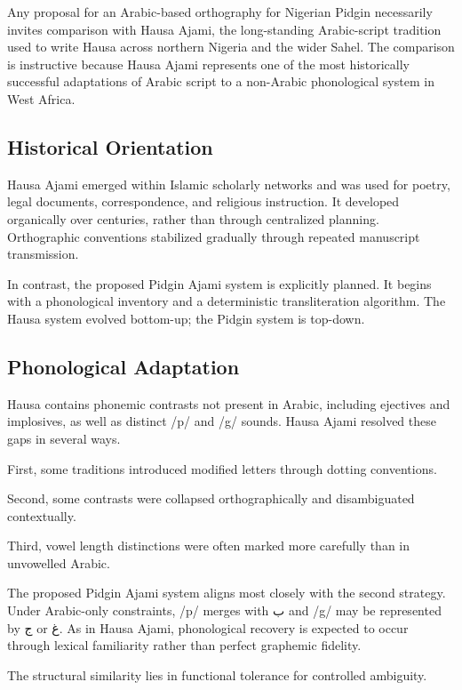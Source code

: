 \documentclass[12pt]{article}
\newcommand{\AR}[1]{\foreignlanguage{arabic}{#1}}
\begin{document}
Any proposal for an Arabic-based orthography for Nigerian Pidgin necessarily invites comparison with Hausa Ajami, the long-standing Arabic-script tradition used to write Hausa across northern Nigeria and the wider Sahel. The comparison is instructive because Hausa Ajami represents one of the most historically successful adaptations of Arabic script to a non-Arabic phonological system in West Africa.

\subsection{Historical Orientation}

Hausa Ajami emerged within Islamic scholarly networks and was used for poetry, legal documents, correspondence, and religious instruction. It developed organically over centuries, rather than through centralized planning. Orthographic conventions stabilized gradually through repeated manuscript transmission.

In contrast, the proposed Pidgin Ajami system is explicitly planned. It begins with a phonological inventory and a deterministic transliteration algorithm. The Hausa system evolved bottom-up; the Pidgin system is top-down.

\subsection{Phonological Adaptation}

Hausa contains phonemic contrasts not present in Arabic, including ejectives and implosives, as well as distinct /p/ and /g/ sounds. Hausa Ajami resolved these gaps in several ways.

First, some traditions introduced modified letters through dotting conventions.

Second, some contrasts were collapsed orthographically and disambiguated contextually.

Third, vowel length distinctions were often marked more carefully than in unvowelled Arabic.

The proposed Pidgin Ajami system aligns most closely with the second strategy. Under Arabic-only constraints, /p/ merges with \AR{ب} and /g/ may be represented by \AR{ج} or \AR{غ}. As in Hausa Ajami, phonological recovery is expected to occur through lexical familiarity rather than perfect graphemic fidelity.

The structural similarity lies in functional tolerance for controlled ambiguity.
\end{document}

